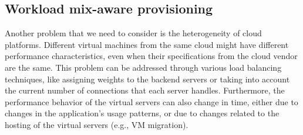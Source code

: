 \subsection{Workload mix-aware provisioning}




Another problem that we need to consider is the heterogeneity of cloud platforms.
Different virtual machines from the same cloud might have different performance
characteristics, even when their specifications from the cloud vendor are the same.
This problem can be addressed through various load balancing techniques, like
assigning weights to the backend servers or taking into account the current number
of connections that each server handles. Furthermore, the performance behavior
of the virtual servers can also change in time, either due to changes in
the application's usage patterns, or due to changes related to the hosting
of the virtual servers (e.g., VM migration).

